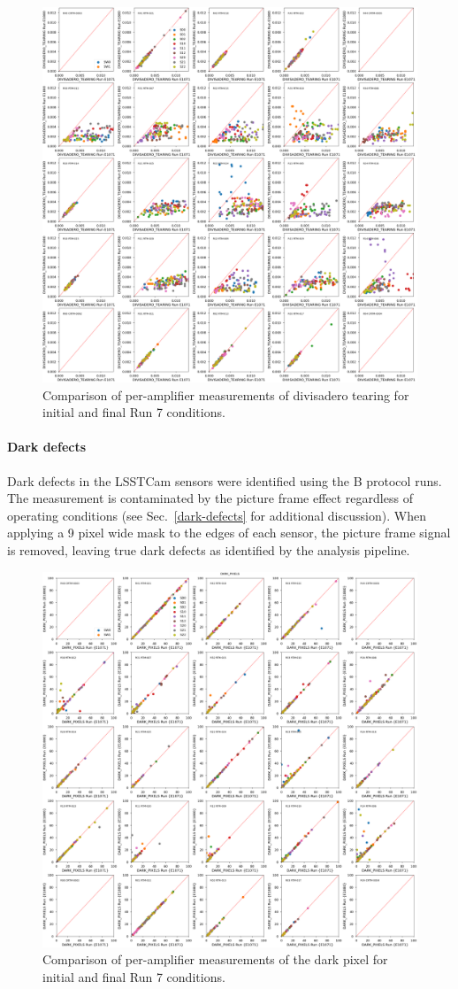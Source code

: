 \begin{figure}[ht]
    \centering
    \includegraphics[width=0.7\linewidth]{figures/finalCharacterization/E1071_E1880_DIVISADERO_TEARING.png}
    \caption{Comparison of per-amplifier measurements of divisadero tearing for initial and final Run 7 conditions.}
    \label{fig:finalChar-Divisadero-5x5}
\end{figure}


\clearpage
\paragraph{Dark defects}\label{final-dark-defects}

Dark defects in the LSSTCam sensors were identified using the B protocol runs.  The measurement is contaminated by the picture frame effect regardless of operating conditions (see Sec.~\ref{dark-defects} for additional discussion). When applying a 9 pixel wide mask to the edges of each sensor, the picture frame signal is removed, leaving true dark defects as identified by the analysis pipeline.

\begin{figure}[ht]
    \centering
    \includegraphics[width=0.7\linewidth]{figures/finalCharacterization/E1880_E1071_DARK_PIXELS_inset.png}
    \caption{Comparison of per-amplifier measurements of the dark pixel for initial and final Run 7 conditions.}
    \label{fig:finalChar-DarkPix-5x5}
\end{figure}

